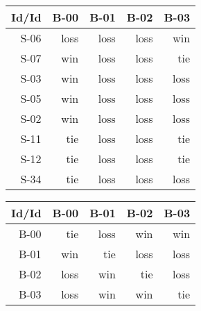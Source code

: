 \begin{tabular}{ | r | r | r | r | r | }
    \hline
        Id/Id  &   B-00  &   B-01  &   B-02  &   B-03  \\
    \hline
    \hline
         S-06  &   loss  &   loss  &   loss  &    win  \\
    \hline
         S-07  &    win  &   loss  &   loss  &    tie  \\
    \hline
         S-03  &    win  &   loss  &   loss  &   loss  \\
    \hline
         S-05  &    win  &   loss  &   loss  &   loss  \\
    \hline
         S-02  &    win  &   loss  &   loss  &   loss  \\
    \hline
         S-11  &    tie  &   loss  &   loss  &    tie  \\
    \hline
         S-12  &    tie  &   loss  &   loss  &    tie  \\
    \hline
         S-34  &    tie  &   loss  &   loss  &   loss  \\
    \hline
\end{tabular}


\begin{tabular}{ | r | r | r | r | r | }
    \hline
        Id/Id  &   B-00  &   B-01  &   B-02  &   B-03  \\
    \hline
    \hline
         B-00  &    tie  &   loss  &    win  &    win  \\
    \hline
         B-01  &    win  &    tie  &   loss  &   loss  \\
    \hline
         B-02  &   loss  &    win  &    tie  &   loss  \\
    \hline
         B-03  &   loss  &    win  &    win  &    tie  \\
    \hline
\end{tabular}




